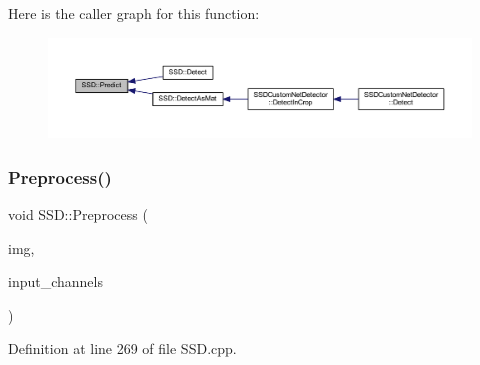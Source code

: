 Here is the caller graph for this function\+:\nopagebreak
\begin{figure}[H]
\begin{center}
\leavevmode
\includegraphics[width=350pt]{class_s_s_d_a58c0ef81b4b24424fd967d90da5c6045_icgraph}
\end{center}
\end{figure}
\mbox{\label{class_s_s_d_a83cb8c64cda9b3792c5612613b56c828}} 
\subsubsection{\texorpdfstring{Preprocess()}{Preprocess()}}
{\footnotesize\ttfamily void S\+S\+D\+::\+Preprocess (\begin{DoxyParamCaption}\item[{const Mat \&}]{img,  }\item[{std\+::vector$<$ \mbox{\hyperlink{gpu__allocator_8h_aa7700da124206551c0f9d273152f13fb}{Gpu\+Mat}} $>$ $\ast$}]{input\+\_\+channels }\end{DoxyParamCaption})\hspace{0.3cm}{\ttfamily [private]}}



Definition at line 269 of file S\+S\+D.\+cpp.


